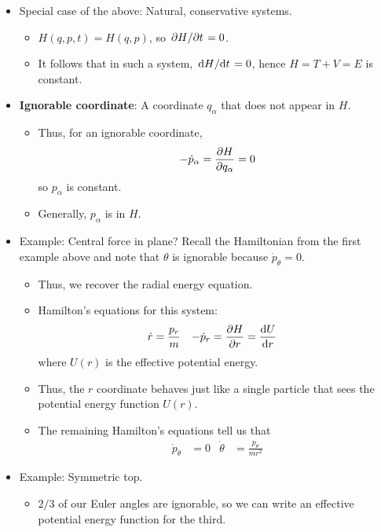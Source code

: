 \documentclass[../notes.tex]{subfiles}
\begin{document}
\begin{itemize}
\begin{itemize}
    \end{itemize}
    \item Special case of the above: Natural, conservative systems.
    \begin{itemize}
        \item $H(q,p,t)=H(q,p)$, so $\pdv*{H}{t}=0$.
        \item It follows that in such a system, $\dv*{H}{t}=0$, hence $H=T+V=E$ is constant.
    \end{itemize}
    \item \textbf{Ignorable coordinate}: A coordinate $q_\alpha$ that does not appear in $H$.
    \begin{itemize}
        \item Thus, for an ignorable coordinate,
        \begin{equation*}
            -\dot{p}_\alpha = \pdv{H}{q_\alpha} = 0
        \end{equation*}
        so $p_\alpha$ is constant.
        \item Generally, $p_\alpha$ is in $H$.
    \end{itemize}
    \item Example: Central force in plane? Recall the Hamiltonian from the first example above and note that $\theta$ is ignorable because $\dot{p}_\theta=0$.
    \begin{itemize}
        \item Thus, we recover the radial energy equation.
        \item Hamilton's equations for this system:
        \begin{align*}
            \dot{r} &= \frac{p_r}{m}&
            -\dot{p}_r &= \pdv{H}{r} = \dv{U}{r}
        \end{align*}
        where $U(r)$ is the effective potential energy.
        \item Thus, the $r$ coordinate behaves just like a single particle that sees the potential energy function $U(r)$.
        \item The remaining Hamilton's equations tell us that
        \begin{align*}
            \dot{p}_\theta &= 0&
            \dot{\theta} &= \frac{p_\theta}{mr^2}
        \end{align*}
    \end{itemize}
    \item Example: Symmetric top.
    \begin{itemize}
        \item $2/3$ of our Euler angles are ignorable, so we can write an effective potential energy function for the third.

\end{itemize}
\end{itemize}
\end{document}
